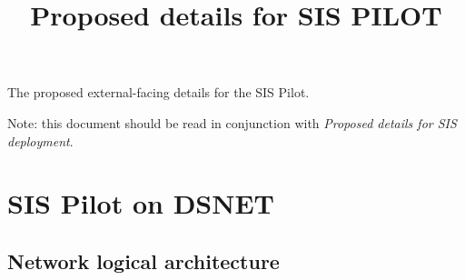 \documentclass[10pt,a4paper]{article}
\begin{document}
\title{Proposed details for SIS PILOT}
\maketitle{}

The proposed external-facing details for the SIS Pilot.

Note: this document should be read in conjunction with \emph{Proposed details for SIS deployment}.

\section{SIS Pilot on DSNET}

\subsection{Network logical architecture}
\end{document}
